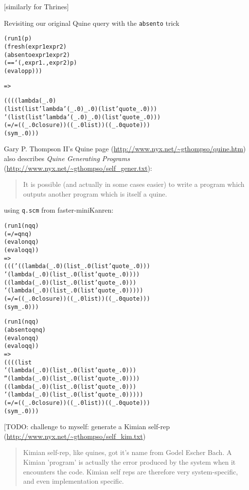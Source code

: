 \documentclass{book}
\begin{document}
[similarly for Thrines]

Revisiting our original Quine query with the \verb|absento| trick

\begin{alltt}
(run 1 (p)
  (fresh (expr1 expr2)
    (absento expr1 expr2)
    (== `(,expr1 . ,expr2) p)
    (evalo p p)))
\end{alltt}
\verb|=>|
\begin{alltt}
((((lambda (_.0)
     (list (list 'lambda '(_.0) _.0) (list 'quote _.0)))
   '(list (list 'lambda '(_.0) _.0) (list 'quote _.0)))
  (=/= ((_.0 closure)) ((_.0 list)) ((_.0 quote)))
  (sym _.0)))
\end{alltt}


Gary P. Thompson II's Quine page (\url{http://www.nyx.net/~gthompso/quine.htm}) also describes \emph{Quine Generating Programs} (\url{http://www.nyx.net/~gthompso/self_gener.txt}):

\begin{quote}
It is possible (and actually in some cases easier) to write a program which outputs another program which is itself a quine.
\end{quote}

using \verb|q.scm| from faster-miniKanren:

\begin{alltt}
(run 1 (nq q)
  (=/= q nq)
  (evalo nq q)
  (evalo q q))
=>
((('((lambda (_.0) (list _.0 (list 'quote _.0)))
     '(lambda (_.0) (list _.0 (list 'quote _.0))))
   ((lambda (_.0) (list _.0 (list 'quote _.0)))
    '(lambda (_.0) (list _.0 (list 'quote _.0)))))
  (=/= ((_.0 closure)) ((_.0 list)) ((_.0 quote)))
  (sym _.0)))
\end{alltt}

\begin{alltt}
(run 1 (nq q)
  (absento q nq)
  (evalo nq q)
  (evalo q q))
=>
((((list
     '(lambda (_.0) (list _.0 (list 'quote _.0)))
     ''(lambda (_.0) (list _.0 (list 'quote _.0))))
   ((lambda (_.0) (list _.0 (list 'quote _.0)))
    '(lambda (_.0) (list _.0 (list 'quote _.0)))))
  (=/= ((_.0 closure)) ((_.0 list)) ((_.0 quote)))
  (sym _.0)))
\end{alltt}


[TODO: challenge to myself: generate a Kimian self-rep (\url{http://www.nyx.net/~gthompso/self_kim.txt})

\begin{quote}
Kimian self-rep, like quines, got it's name from Godel Escher Bach.  A
Kimian 'program' is actually the error produced by the system when it
encounters the code.  Kimian self reps are therefore very system-specific,
and even implementation specific.
\end{quote}
\end{document}
